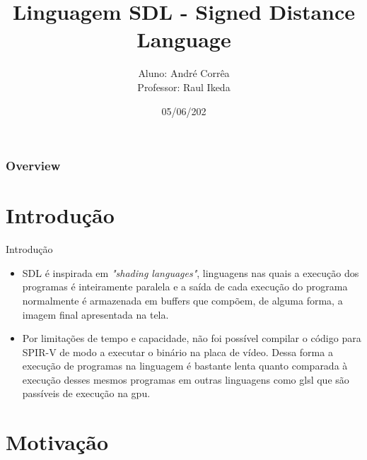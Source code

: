 \documentclass[2pt]{beamer} %
\title[]{Linguagem SDL - Signed Distance Language}
\author[André Corrêa]{
Aluno: André Corrêa\\
[3mm] Professor: Raul Ikeda
}
\institute[Insper] %
{
Insper - Instituto de Ensino e Pesquisa \\ %
\medskip
\textit{andrecs11@al.insper.edu.br\\}%
}
\date{05/06/202} %
\begin{document}
\begin{frame}
\titlepage %
\end{frame}

\begin{frame}
\frametitle{Overview} %
\tableofcontents %
\end{frame}



\section{Introdução}
\begin{frame}{Introdução}

\begin{itemize}
    \item SDL é inspirada em \textit{"shading languages"}, linguagens nas quais a execução dos programas é inteiramente paralela e a saída de cada execução do  programa normalmente é armazenada em buffers que compõem, de alguma forma, a imagem final apresentada na tela.
    \item Por limitações de tempo e capacidade, não foi possível compilar o código para SPIR-V de modo a executar o binário na placa de vídeo. Dessa forma a execução de programas na linguagem é bastante lenta quanto comparada à execução desses mesmos programas em outras linguagens como glsl que são passíveis de execução na gpu.
\end{itemize}
    
\end{frame}



\section{Motivação}
\end{document}
